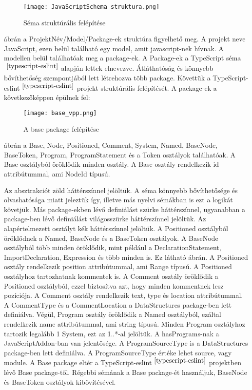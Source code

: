\begin{figure}[!htbp]
      \caption{Séma struktúrális felépítése}\label{fig:JavaScriptSchema_struktura}
      \centering
      \texttt{[image: JavaScriptSchema\_struktura.png]}
\end{figure}

 ábrán a ProjektNév/Model/Package-ek struktúra figyelhető meg.
A projekt neve JavaScript, ezen belül található egy model, amit javascript-nek hívnak.
A modellen belül találhatóak meg a package-ek.
A Package-ek a TypeScript séma $^{~\cite{typescript-eslint}}$ alapján lettek elnevezve.
Átláthatóság és könnyebb bővíthetőség szempontjából lett létrehozva több package.
Követtük a TypeScript-eslint$^{~\cite{typescript-eslint}}$ projekt struktúrális felépítését.
A package-ek a következőképpen épülnek fel:
\begin{figure}[!htbp]
      \caption{A base package felépítése}\label{fig:base_vpp}
      \centering
      \texttt{[image: base\_vpp.png]}
\end{figure}

 ábrán a Base, Node, Positioned, Comment, System, Named, BaseNode, BaseToken, Program, ProgramStatement és a Token osztályok találhatóak.
A Base osztályból öröklődik minden osztály.
A Base osztály rendelkezik id attribútummal, ami NodeId típusú.

\noindent

Az absztrakciót zöld háttérszínnel jelöltük.
A séma könnyebb bővíthetősége és olvashatósága miatt jeleztük így, illetve más nyelvi sémákban is ezt a logikát követjük.
Más package-ekben lévő definiálást szürke háttérszínnel, ugyanabban a package-ben lévő definiálást világosszürke háttérszínnel jelöltük.
Az alapértelmezett osztályt kék háttérszínnel jelöltük.
A Positioned osztályból öröklődnek a Named, BaseNode és a BaseToken osztályok.
A BaseNode osztályból több minden öröklődik, mint például a DeclarationStatement, ImportDeclaration, Expression és több minden is. Ez látható  ábrán.
A Positioned osztály rendelkezik position attribútummal, ami Range típusú. A Positioned osztályhoz tartozhatnak kommentek is.
A Comment osztály öröklődik a Positioned osztályból, ezzel biztosítva azt, hogy minden kommentnek lesz pozíciója.
A Comment osztály rendelkezik text, type és location attribútummal.
A CommentType és a CommentLocation a DataStructures package-ben lett definiálva.
Végül, Program osztály öröklődik a Named osztályból, ezáltal rendelkezik name attribútummal, ami string típusú.
Minden Program osztályhoz tartozik legalább 1 System, ezt az 1..*-al jelöltük.
A hasPrograms-nak a JavaScriptAddon-ban van jelentősége.
A ProgramSourceType is a DataStructures package-ben lett definiálva. A ProgramSourceType értéke lehet source, vagy module.
A Base package eltér a TypeScript-eslint$^{~\cite{typescript-eslint}}$ projektben lévő Base package-től.
Régebbi sémának a Base package-ét használjuk, BaseNode és BaseToken osztályok kibővítésével.

